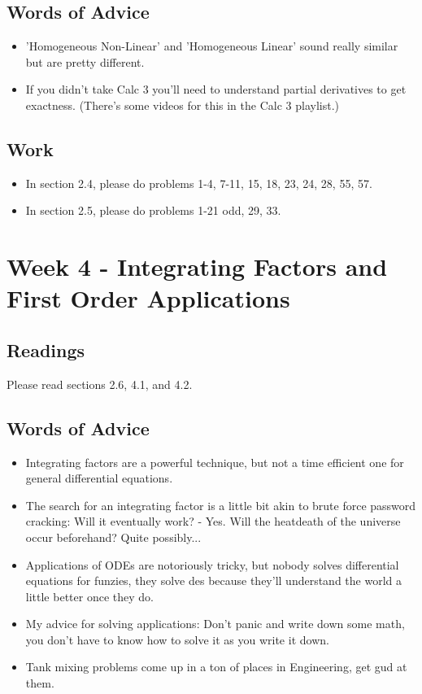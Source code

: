 	\subsection{Words of Advice}
		\begin{itemize}
			\item 'Homogeneous Non-Linear' and 'Homogeneous Linear' sound really similar but are pretty different.
			\item If you didn't take Calc 3 you'll need to understand partial derivatives to get exactness. (There's some videos for this in the Calc 3 playlist.)
		\end{itemize}

	\subsection{Work}
		\begin{itemize}
			\item In section 2.4, please do problems 1-4, 7-11, 15, 18, 23, 24, 28, 55, 57.
			\item In section 2.5, please do problems 1-21 odd, 29, 33.
		\end{itemize}

	\clearpage



	\section{Week 4 - Integrating Factors and First Order Applications}

	\subsection{Readings}
		Please read sections 2.6, 4.1, and 4.2.

	\subsection{Words of Advice}
		\begin{itemize}
			\item Integrating factors are a powerful technique, but not a time efficient one for general differential equations.
			\item The search for an integrating factor is a little bit akin to brute force password cracking: Will it eventually work? - Yes. Will the heatdeath of the universe occur beforehand? Quite possibly...
			\item Applications of ODEs are notoriously tricky, but nobody solves differential equations for funzies, they solve des because they'll understand the world a little better once they do.
			\item My advice for solving applications: Don't panic and write down some math, you don't have to know how to solve it as you write it down.
			\item Tank mixing problems come up in a ton of places in Engineering, get gud at them.
		\end{itemize}

